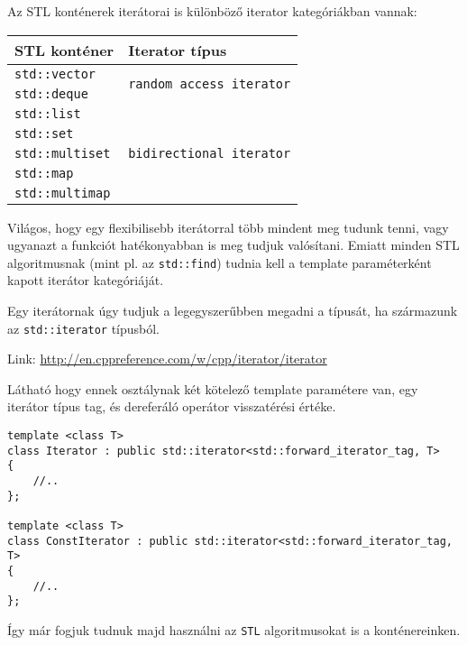 \documentclass[a4paper,11.5pt]{article}
\begin{document}
	\smallskip
	Az STL konténerek iterátorai is különböző iterator kategóriákban vannak:
	\begin{center}
		\begin{tabular}{|l|l|}
			\hline
			STL konténer&Iterator típus\\
			\hline
			\hline
			\texttt{std::vector} & \multirow{2}{*}{\texttt{random access iterator}}\\
			\texttt{std::deque} &\\
			\hline
			\texttt{std::list} & \multirow{5}{*}{\texttt{bidirectional iterator}}\\
			\texttt{std::set} & \\
			\texttt{std::multiset} & \\
			\texttt{std::map} & \\
			\texttt{std::multimap} & \\
			\hline
		\end{tabular}
	\end{center}
	Világos, hogy egy flexibilisebb iterátorral több mindent meg tudunk tenni, vagy ugyanazt a funkciót hatékonyabban is meg tudjuk valósítani. Emiatt minden STL algoritmusnak (mint pl. az \texttt{std::find}) tudnia kell a template paraméterként kapott iterátor kategóriáját.
	\medskip
	
	Egy iterátornak úgy tudjuk a legegyszerűbben megadni a típusát, ha származunk az \texttt{std::iterator} típusból.
	
	Link: \url{http://en.cppreference.com/w/cpp/iterator/iterator}
	
	Látható hogy ennek osztálynak két kötelező template paramétere van, egy iterátor típus tag, és dereferáló operátor visszatérési értéke.
	
	\begin{lstlisting}
template <class T>
class Iterator : public std::iterator<std::forward_iterator_tag, T>
{
	//..
};

template <class T>
class ConstIterator : public std::iterator<std::forward_iterator_tag, T>
{
	//..
};
	\end{lstlisting}
	Így már fogjuk tudnuk majd használni az \texttt{STL} algoritmusokat is a konténereinken. 
%		
	
\end{document}
